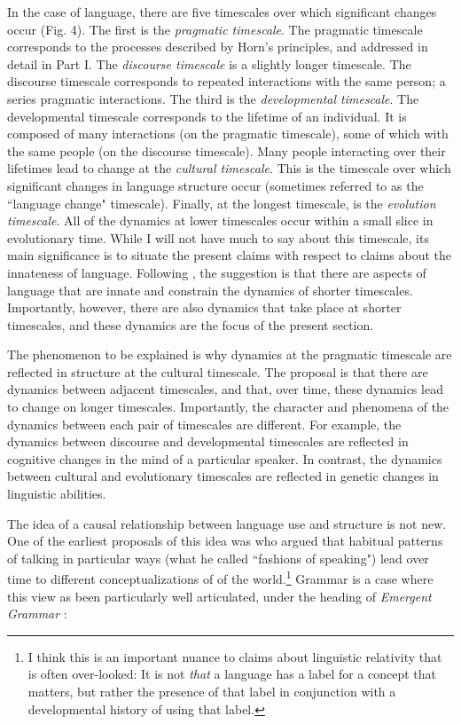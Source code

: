 \documentclass[man, noapacite, 12pt]{apa2}
\begin{document}
In the case of language,  there are five timescales over which significant changes occur (Fig. 4). The first is the {\it pragmatic timescale}. The pragmatic timescale corresponds to the processes described by Horn's principles, and addressed in detail in Part I. The {\it discourse timescale} is a slightly longer timescale. The discourse timescale corresponds to repeated interactions with the same person; a series pragmatic interactions. The third is the {\it developmental timescale}. The developmental timescale corresponds to the lifetime of an individual. It is composed of many interactions (on the pragmatic timescale), some of which with the same people (on the discourse timescale).  Many people interacting over their lifetimes lead to change at the {\it cultural timescale}. This is the timescale over which significant changes in language structure  occur (sometimes referred to as the ``language change" timescale). Finally, at the longest timescale, is the {\it evolution timescale}. All of the dynamics at lower timescales occur within a small slice in evolutionary time. While I will not have much to say about this timescale, its main significance is to situate the present claims with respect to claims about the innateness of language. Following , the suggestion is that there are aspects of language that are innate and constrain the dynamics of shorter timescales. Importantly, however, there are also  dynamics that take place at  shorter timescales, and these dynamics are the focus of the present section.

The phenomenon to be explained is why dynamics at the pragmatic timescale are reflected in structure at the cultural timescale. The proposal is that there are dynamics between adjacent timescales, and that, over time, these dynamics lead to change on longer timescales. Importantly, the character and phenomena of the dynamics between each pair of timescales are different. For example,  the dynamics between discourse and developmental timescales are reflected in cognitive changes in the mind of a particular speaker. In contrast, the dynamics between cultural and evolutionary timescales are reflected in genetic changes in linguistic abilities.

The idea of a causal relationship between language use and structure is not new. One of the earliest proposals of this idea was  who argued that habitual patterns of talking in particular ways (what he called ``fashions of speaking") lead over time to different conceptualizations of of the world.\footnote{I think this is an important nuance to claims about linguistic relativity that is often over-looked: It is not {\it that} a language has a label for a concept that matters,  but rather the presence of that label in conjunction with a developmental history of using that label.} Grammar is a case where this view as been particularly well articulated, under the heading of {\it Emergent Grammar} \cite{hopper1987emergent}: 
\end{document}
